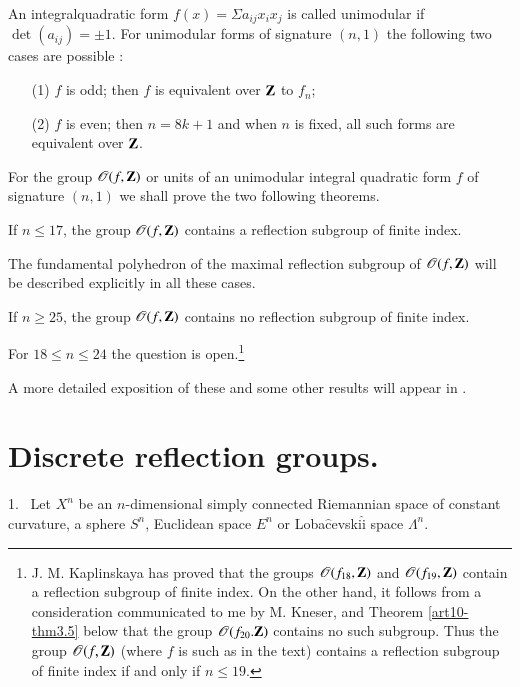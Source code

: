 An integral\pageoriginale quadratic form $f(x) = \Sigma a_{ij} x_i x_j$ is called unimodular if $\det (a_{ij}) = \pm 1$. For unimodular forms of signature $(n,1)$ the following two cases are possible \cite{art10-key6}:
\begin{itemize}
\item[(1)] $f$ is odd; then $f$ is equivalent over $\mathbf{Z}$ to $f_n$;

\item[(2)] $f$ is even; then $n = 8k +1$ and when $n$ is fixed, all such forms are equivalent over $\mathbf{Z}$.
\end{itemize}

For the group $\mathscr{O}(f, \mathbf{Z})$ or units of an unimodular integral quadratic form $f$ of signature $(n,1)$ we shall prove the two following theorems. 


\begin{alphtheorem}\label{art10-alphathmA}
If  $n \leqslant 17$, the group $\mathscr{O} (f, \mathbf{Z})$ contains a reflection subgroup of finite index.
\end{alphtheorem}

The fundamental polyhedron of the maximal reflection subgroup of $\mathscr{O} (f, \mathbf{Z})$ will be described explicitly in all these cases.

\begin{alphtheorem}\label{art10-alphathmB}
If $n \geqslant 25$, the group $\mathscr{O} (f, \mathbf{Z})$ contains no reflection subgroup of finite index.
\end{alphtheorem}

For $18 \leqslant n \leqslant 24$ the question is open.\footnote{J. M. Kaplinskaya has proved that the groups $\mathscr{O}(f_{18}, \mathbf{Z})$ and $\mathscr{O} (f_{19}, \mathbf{Z})$ contain a reflection subgroup of finite index. On the other hand, it follows from a consideration communicated to me by M. Kneser, and Theorem \ref{art10-thm3.5} below that the group $\mathscr{O} (f_{20}. \mathbf{Z})$ contains no such subgroup. Thus the group $\mathscr{O} (f, \mathbf{Z})$ (where $f$ is such as in the text) contains a reflection subgroup of finite index if and only if $n \leqslant 19$.}

A more detailed exposition of these and some other results will appear in \cite{art10-key13, art10-key14}.

\section{Discrete reflection groups.}\label{art10-sec1}

1.~ Let $X^n$ be an $n$-dimensional simply connected Riemannian space of constant curvature, \ie a sphere $S^n$, Euclidean space $E^n$ or Loba$\hat{\text{c}}$evski$\hat{\text{i}}$ space $\Lambda^n$.

